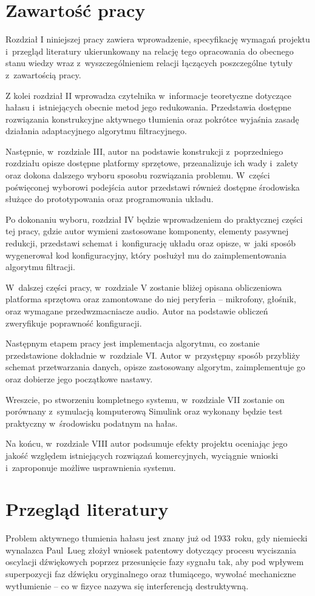 \section{Zawartość pracy}
\label{sec:zawartoscPracy}
Rozdział I niniejszej pracy zawiera wprowadzenie, specyfikację wymagań projektu i~przegląd literatury ukierunkowany na relację tego opracowania do obecnego stanu wiedzy wraz z~wyszczególnieniem relacji łączących poszczególne tytuły z~zawartością pracy.

Z kolei rozdział II wprowadza czytelnika w~informacje teoretyczne dotyczące hałasu i~istniejących obecnie metod jego redukowania. Przedstawia dostępne rozwiązania konstrukcyjne aktywnego tłumienia oraz pokrótce wyjaśnia zasadę działania adaptacyjnego algorytmu filtracyjnego.

Następnie, w~rozdziale III, autor na podstawie konstrukcji z~poprzedniego rozdziału opisze dostępne platformy sprzętowe, przeanalizuje ich wady i~zalety oraz dokona dalszego wyboru sposobu rozwiązania problemu. W~części poświęconej wyborowi podejścia autor przedstawi również dostępne środowiska służące do prototypowania oraz programowania układu.

Po dokonaniu wyboru, rozdział IV będzie wprowadzeniem do praktycznej części tej pracy, gdzie autor wymieni zastosowane komponenty, elementy pasywnej redukcji, przedstawi schemat i~konfigurację układu oraz opisze, w~jaki sposób wygenerował kod konfiguracyjny, który posłużył mu do zaimplementowania algorytmu filtracji.

W~dalszej części pracy, w~rozdziale V zostanie bliżej opisana obliczeniowa platforma sprzętowa oraz zamontowane do niej peryferia -- mikrofony, głośnik, oraz wymagane przedwzmacniacze audio. Autor na podstawie obliczeń zweryfikuje poprawność konfiguracji.

Następnym etapem pracy jest implementacja algorytmu, co zostanie przedstawione dokładnie w~rozdziale VI. Autor w~przystępny sposób przybliży schemat przetwarzania danych, opisze zastosowany algorytm, zaimplementuje go oraz dobierze jego początkowe nastawy.

Wreszcie, po stworzeniu kompletnego systemu, w~rozdziale VII zostanie on porównany z~symulacją komputerową Simulink oraz wykonany będzie test praktyczny w~środowisku podatnym na hałas.

Na końcu, w~rozdziale VIII autor podsumuje efekty projektu oceniając jego jakość względem istniejących rozwiązań komercyjnych, wyciągnie wnioski i~zaproponuje możliwe usprawnienia systemu.
\section{Przegląd literatury}
Problem aktywnego tłumienia hałasu jest znany już od 1933~roku, gdy niemiecki wynalazca Paul~Lueg złożył wniosek patentowy\cite{LuegPatent} dotyczący procesu wyciszania oscylacji dźwiękowych poprzez przesunięcie fazy sygnału tak, aby pod wpływem superpozycji faz dźwięku oryginalnego oraz tłumiącego, wywołać mechaniczne wytłumienie -- co w fizyce nazywa się interferencją destruktywną.

